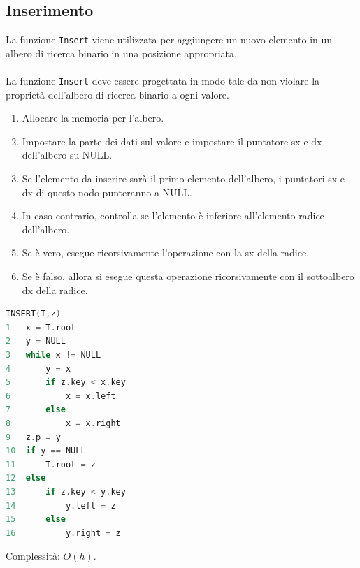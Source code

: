 \subsection{Inserimento}
La funzione \verb|Insert| viene utilizzata per aggiungere un nuovo elemento in un albero di ricerca binario in una posizione appropriata. \\~\\
La funzione \verb|Insert| deve essere progettata in modo tale da non violare la proprietà dell'albero di ricerca binario a ogni valore.
\begin{enumerate}
    \item Allocare la memoria per l'albero.
    \item Impostare la parte dei dati sul valore e impostare il puntatore sx e dx dell'albero su NULL.
    \item Se l'elemento da inserire sarà il primo elemento dell'albero, i puntatori sx e dx di questo nodo punteranno a NULL.
    \item In caso contrario, controlla se l'elemento è inferiore all'elemento radice dell'albero. 
    \item Se è vero, esegue ricorsivamente l'operazione con la sx della radice.
    \item Se è falso, allora si esegue questa operazione ricorsivamente con il sottoalbero dx della radice.
\end{enumerate}
\begin{mdframed}
\begin{lstlisting}[language=C]
INSERT(T,z)
1   x = T.root
2   y = NULL
3   while x != NULL
4       y = x
5       if z.key < x.key
6           x = x.left
7       else
8           x = x.right
9   z.p = y
10  if y == NULL
11      T.root = z
12  else
13      if z.key < y.key
14          y.left = z
15      else
16          y.right = z
\end{lstlisting}
\end{mdframed}
Complessità: $O(h)$.

